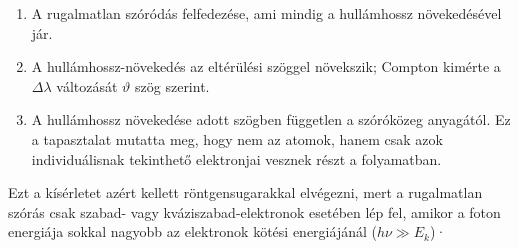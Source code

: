 \documentclass[../main.tex]{subfiles}
\begin{document}
\begin{enumerate}
    \item A rugalmatlan szóródás felfedezése, ami mindig a hullámhossz növekedésével jár.
    \item A hullámhossz-növekedés az eltérülési szöggel növekszik; Compton kimérte a $\Delta \lambda$ változását $\vartheta$ szög szerint.
    \item A hullámhossz növekedése adott szögben független a szóróközeg anyagától. Ez a tapasztalat mutatta meg, hogy nem az atomok, hanem csak azok individuálisnak tekinthető elektronjai vesznek részt a folyamatban.
\end{enumerate}
Ezt a kísérletet azért kellett röntgensugarakkal elvégezni, mert a rugalmatlan szórás csak szabad- vagy kváziszabad-elektronok esetében lép fel,
amikor a foton energiája sokkal nagyobb az elektronok kötési energiájánál ($h \nu \gg E_k$)·
\end{document}
